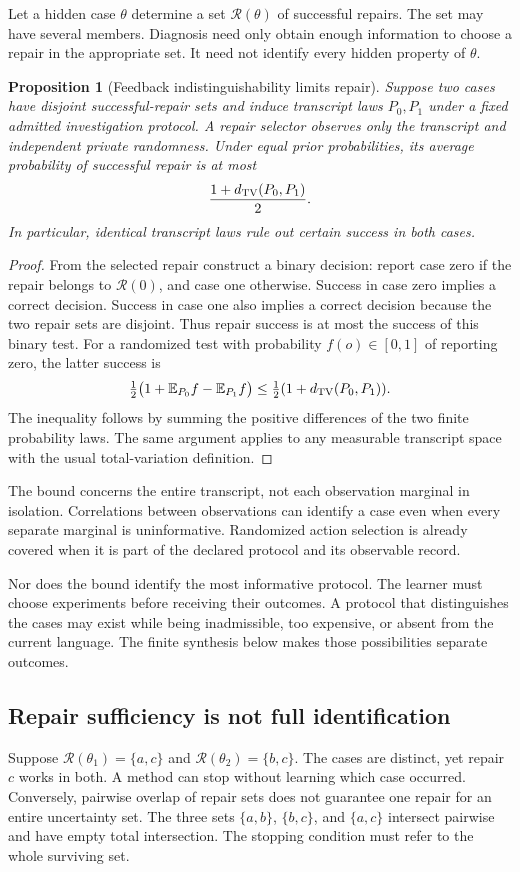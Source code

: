 \documentclass[11pt,letterpaper]{article}
\theoremstyle{plain}
\newtheorem{proposition}[theorem]{Proposition}
\theoremstyle{definition}
\begin{document}
Let a hidden case $\theta$ determine a set $\mathcal R(\theta)$ of successful repairs. The set may have several members. Diagnosis need only obtain enough information to choose a repair in the appropriate set. It need not identify every hidden property of $\theta$.

\begin{proposition}[Feedback indistinguishability limits repair]\label{prop:indistinguishable}
Suppose two cases have disjoint successful-repair sets and induce transcript laws $P_0,P_1$ under a fixed admitted investigation protocol. A repair selector observes only the transcript and independent private randomness. Under equal prior probabilities, its average probability of successful repair is at most
\[
\frac{1+d_{\mathrm{TV}}(P_0,P_1)}2.
\]
In particular, identical transcript laws rule out certain success in both cases.
\end{proposition}
\begin{proof}
From the selected repair construct a binary decision: report case zero if the repair belongs to $\mathcal R(0)$, and case one otherwise. Success in case zero implies a correct decision. Success in case one also implies a correct decision because the two repair sets are disjoint. Thus repair success is at most the success of this binary test. For a randomized test with probability $f(o)\in[0,1]$ of reporting zero, the latter success is
\[
\tfrac12\big(1+\mathbb E_{P_0}f-\mathbb E_{P_1}f\big)
\leq\tfrac12(1+d_{\mathrm{TV}}(P_0,P_1)).
\]
The inequality follows by summing the positive differences of the two finite probability laws. The same argument applies to any measurable transcript space with the usual total-variation definition.
\end{proof}

The bound concerns the entire transcript, not each observation marginal in isolation. Correlations between observations can identify a case even when every separate marginal is uninformative. Randomized action selection is already covered when it is part of the declared protocol and its observable record.

Nor does the bound identify the most informative protocol. The learner must choose experiments before receiving their outcomes. A protocol that distinguishes the cases may exist while being inadmissible, too expensive, or absent from the current language. The finite synthesis below makes those possibilities separate outcomes.

\subsection{Repair sufficiency is not full identification}
Suppose $\mathcal R(\theta_1)=\{a,c\}$ and $\mathcal R(\theta_2)=\{b,c\}$. The cases are distinct, yet repair $c$ works in both. A method can stop without learning which case occurred. Conversely, pairwise overlap of repair sets does not guarantee one repair for an entire uncertainty set. The three sets $\{a,b\}$, $\{b,c\}$, and $\{a,c\}$ intersect pairwise and have empty total intersection. The stopping condition must refer to the whole surviving set.
\end{document}
